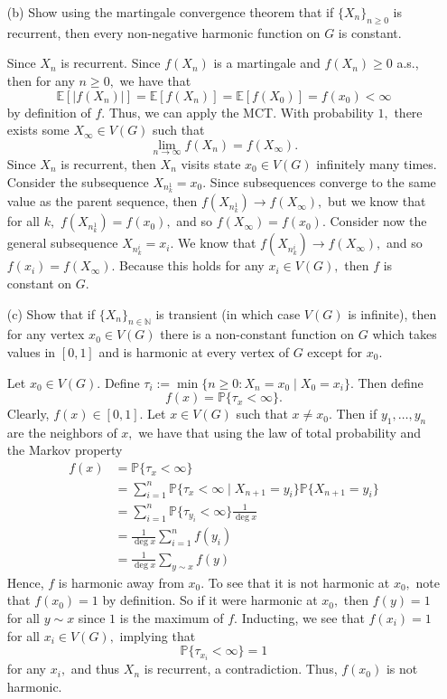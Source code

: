 \documentclass[11pt]{article}
\newcommand{\bbE}{\mathbb{E}}
\newcommand{\bbP}{\mathbb{P}}
\begin{document}
\begin{itemize}
\begin{solution}
\end{solution}
    \item[(b)] Show using the martingale convergence theorem that if \(\{X_n\}_{n \geq 0}\) is recurrent, then every non-negative harmonic function on \(G\) is constant.
\begin{solution}
    Since $X_n$ is recurrent. Since $f(X_n)$ is a martingale and $f(X_n) \geq 0$ a.s., then for any $n\geq 0,$ we have that 
    \[\bbE[|f(X_n)|] = \bbE[f(X_n)] = \bbE[f(X_0)] = f(x_0)< \infty\] by definition of $f.$ Thus, we can apply the MCT. With probability $1,$ there exists some $X_\infty \in V(G)$ such that 
    \[\lim_{n\to \infty} f(X_n) = f(X_\infty).\] Since $X_n$ is recurrent, then $X_n$ visits state $x_0 \in V(G)$ infinitely many times. Consider the subsequence $X_{n^1_k} = x_0.$ Since subsequences converge to the same value as the parent sequence, then $f(X_{n^1_k}) \to f(X_\infty),$ but we know that for all $k,$ $f(X_{n^1_k}) = f(x_0),$ and so $f(X_\infty) = f(x_0).$ Consider now the general subsequence $X_{n_k^i} = x_i.$ We know that $f(X_{n_k^i}) \to f(X_\infty),$ and so $f(x_i) = f(X_\infty).$ Because this holds for any $x_i \in V(G),$ then $f$ is constant on $G.$ 
\end{solution}

    \item[(c)] Show that if \(\{X_n\}_{n \in \mathbb{N}}\) is transient (in which case \(V(G)\) is infinite), then for any vertex \(x_0 \in V(G)\) there is a non-constant function on \(G\) which takes values in \([0, 1]\) and is harmonic at every vertex of \(G\) except for \(x_0\).
    \begin{solution}
        Let $x_0 \in V(G).$ Define $\tau_i:= \min\{n\geq 0 : X_n = x_0 \mid X_0 = x_i\}.$ Then define 
        \[f(x) = \bbP\{\tau_x < \infty\}.\] Clearly, $f(x) \in [0,1].$ Let $x \in V(G)$ such that $x\neq x_0.$ Then if $y_1, \dots, y_n$ are the neighbors of $x,$ we have that using the law of total probability and the Markov property
        \begin{align*}
            f(x) &= \bbP\{\tau_x < \infty\}\\ &= \sum_{i=1}^n \bbP\{\tau_x < \infty \mid X_{n+1}= y_i\}\bbP\{X_{n+1} = y_i\}\\
            &= \sum_{i=1}^n \bbP\{\tau_{y_i} < \infty\}\frac{1}{\deg x}\\
            &= \frac{1}{\deg x} \sum_{i=1}^n f(y_i)\\
            &= \frac{1}{\deg x}\sum_{y \sim x} f(y)
        \end{align*}
        Hence, $f$ is harmonic away from $x_0.$ To see that it is not harmonic at $x_0,$ note that $f(x_0)= 1$ by definition. So if it were harmonic at $x_0,$ then $f(y) = 1$ for all $y\sim x$ since $1$ is the maximum of $f.$ Inducting, we see that $f(x_i) = 1$ for all $x_i \in V(G),$ implying that 
        \[\bbP\{\tau_{x_i} < \infty\} = 1\] for any $x_i,$ and thus $X_n$ is recurrent, a contradiction. Thus, $f(x_0)$ is not harmonic.


\end{solution}
\end{itemize}
\end{document}
